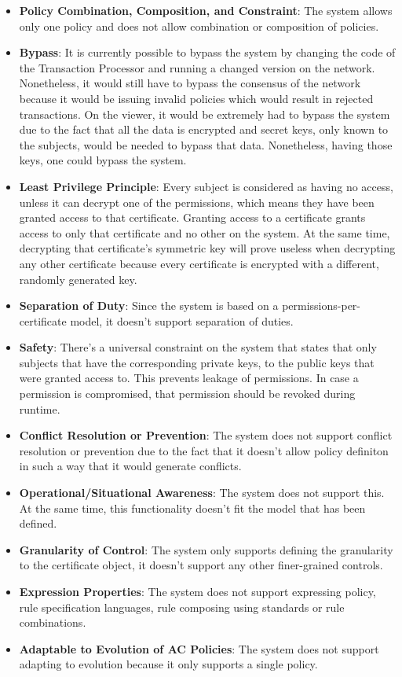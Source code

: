 \begin{itemize}
	\item \textbf{Policy Combination, Composition, and Constraint}: The system allows only one policy and does not allow combination or composition of policies.
	\item \textbf{Bypass}: It is currently possible to bypass the system by changing the code of the Transaction Processor and running a changed version on the network. Nonetheless, it would still have to bypass the consensus of the network because it would be issuing invalid policies which would result in rejected transactions. On the viewer, it would be extremely had to bypass the system due to the fact that all the data is encrypted and secret keys, only known to the subjects, would be needed to bypass that data. Nonetheless, having those keys, one could bypass the system.
	\item \textbf{Least Privilege Principle}: Every subject is considered as having no access, unless it can decrypt one of the permissions, which means they have been granted access to that certificate. Granting access to a certificate grants access to only that certificate and no other on the system. At the same time, decrypting that certificate's symmetric key will prove useless when decrypting any other certificate because every certificate is encrypted with a different, randomly generated key.
	\item \textbf{Separation of Duty}: Since the system is based on a permissions-per-certificate model, it doesn't support separation of duties.
	\item \textbf{Safety}: There's a universal constraint on the system that states that only subjects that have the corresponding private keys, to the public keys that were granted access to. This prevents leakage of permissions. In case a permission is compromised, that permission should be revoked during runtime.
	\item \textbf{Conflict Resolution or Prevention}: The system does not support conflict resolution or prevention due to the fact that it doesn't allow policy definiton in such a way that it would generate conflicts.
	\item \textbf{Operational/Situational Awareness}: The system does not support this. At the same time, this functionality doesn't fit the model that has been defined.
	\item \textbf{Granularity of Control}: The system only supports defining the granularity to the certificate object, it doesn't support any other finer-grained controls.
	\item \textbf{Expression Properties}: The system does not support expressing policy, rule specification languages, rule composing using standards or rule combinations.
	\item \textbf{Adaptable to Evolution of AC Policies}: The system does not support adapting to evolution because it only supports a single policy.
\end{itemize}

